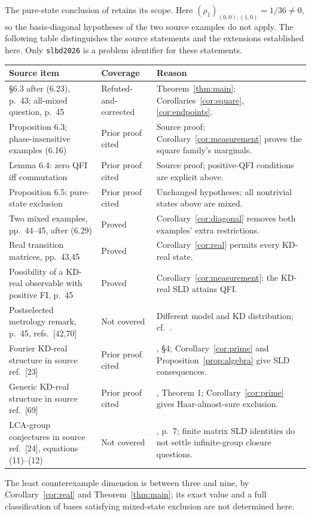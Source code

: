 \documentclass[11pt]{article}
\begin{document}
The pure-state conclusion of \cite[Proposition 6.5]{source} retains its
scope. Here $(\rho_1)_{(0,0),(1,0)}=1/36\ne0$, so the basis-diagonal
hypotheses of the two source examples do not apply. The following table
distinguishes the source statements and the extensions established here.
Only \texttt{slbd2026} is a problem identifier for these statements.
\begin{small}
\setlength{\tabcolsep}{4pt}
\begin{longtable}{@{}p{.36\linewidth}p{.23\linewidth}p{.35\linewidth}@{}}
\textbf{Source item} & \textbf{Coverage} & \textbf{Reason}\\\hline
\S6.3 after (6.23), p.~43; all-mixed question, p.~45
 & Refuted-and-corrected & Theorem~\ref{thm:main}; Corollaries~\ref{cor:square}, \ref{cor:endpoints}.\\
Proposition 6.3; phase-insensitive examples (6.16)
 & Prior proof cited & Source proof; Corollary~\ref{cor:measurement} proves the square family's marginals.\\
Lemma 6.4: zero QFI iff commutation
 & Prior proof cited & Source proof; positive-QFI conditions are explicit above.\\
Proposition 6.5: pure-state exclusion
 & Prior proof cited & Unchanged hypotheses; all nontrivial states above are mixed.\\
Two mixed examples, pp.~44--45, after (6.29)
 & Proved & Corollary~\ref{cor:diagonal} removes both examples' extra restrictions.\\
Real transition matrices, pp.~43,45
 & Proved & Corollary~\ref{cor:real} permits every KD-real state.\\
Possibility of a KD-real observable with positive FI, p.~45
 & Proved & Corollary~\ref{cor:measurement}: the KD-real SLD attains QFI.\\
Postselected metrology remark, p.~45, refs.~[42,70]
 & Not covered & Different model and KD distribution; cf.\ \cite{postselected}.\\
Fourier KD-real structure in source ref.~[23]
 & Prior proof cited & \cite{fourier}, \S4; Corollary~\ref{cor:prime} and Proposition~\ref{prop:algebra} give SLD consequences.\\
Generic KD-real structure in source ref.~[69]
 & Prior proof cited & \cite{generic}, Theorem 1; Corollary~\ref{cor:prime} gives Haar-almost-sure exclusion.\\
LCA-group conjectures in source ref.~[24], equations (11)--(12)
 & Not covered & \cite{lca}, p.~7; finite matrix SLD identities do not settle infinite-group closure questions.\\
\end{longtable}
\end{small}
The least counterexample dimension is between three and nine, by
Corollary~\ref{cor:real} and Theorem~\ref{thm:main}; its exact value and a
full classification of bases satisfying mixed-state exclusion are not
determined here.
\end{document}

